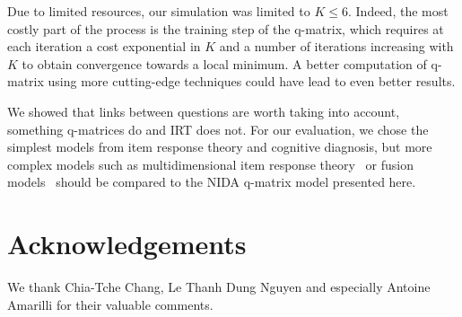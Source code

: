 \documentclass{sig-alternate}
\begin{document}
Due to limited resources, our simulation was limited to $K \leqslant 6$. Indeed, the most costly part of the process is the training step of the q-matrix, which requires at each iteration a cost exponential in $K$ and a number of iterations increasing with $K$ to obtain convergence towards a local minimum. A better computation of q-matrix using more cutting-edge techniques could have lead to even better results.







We showed that links between questions are worth taking into account, something q-matrices do and IRT does not. For our evaluation, we chose the simplest models from item response theory and cognitive diagnosis, but more complex models such as multidimensional item response theory~\citep{Desmarais2012} or fusion models~\citep{McGlohen2008} should be compared to the NIDA q-matrix model presented here.







\section{Acknowledgements}

We thank Chia-Tche Chang, Le Thanh Dung Nguyen and especially Antoine Amarilli for their valuable comments.

%

%
%

\end{document}
